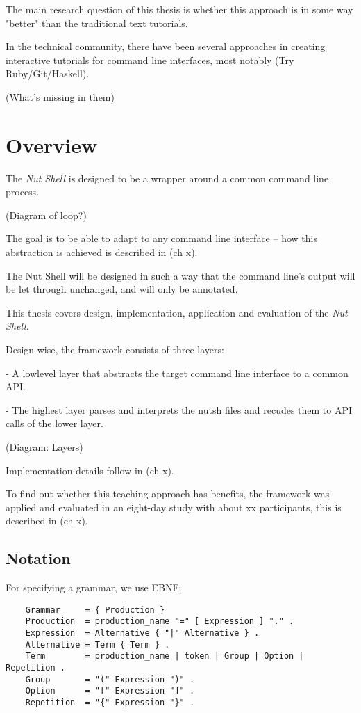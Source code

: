 \documentclass[twoside,parskip]{scrreprt}
\begin{document}
The main research question of this thesis is whether this approach is in some way "better" than the traditional text tutorials.

In the technical community, there have been several approaches in creating interactive tutorials for command line interfaces, most notably (Try Ruby/Git/Haskell).

(What's missing in them)

\section{Overview}

The \emph{Nut Shell} is designed to be a wrapper around a common command line process.

(Diagram of loop?)

The goal is to be able to adapt to any command line interface -- how this abstraction is achieved is described in (ch x).

The Nut Shell will be designed in such a way that the command line's output will be let through unchanged, and will only be annotated.

This thesis covers design, implementation, application and evaluation of the \emph{Nut Shell}.

Design-wise, the framework consists of three layers:

- A lowlevel layer that abstracts the target command line interface to a common API.

- The highest layer parses and interprets the nutsh files and recudes them to API calls of the lower layer.

(Diagram: Layers)

Implementation details follow in (ch x).

To find out whether this teaching approach has benefits, the framework was applied and evaluated in an eight-day study with about xx participants, this is described in (ch x).

\subsection{Notation}

For specifying a grammar, we use EBNF:

\begin{lstlisting}
    Grammar     = { Production }
    Production  = production_name "=" [ Expression ] "." .
    Expression  = Alternative { "|" Alternative } .
    Alternative = Term { Term } .
    Term        = production_name | token | Group | Option | Repetition .
    Group       = "(" Expression ")" .
    Option      = "[" Expression "]" .
    Repetition  = "{" Expression "}" .
\end{lstlisting}
\end{document}

